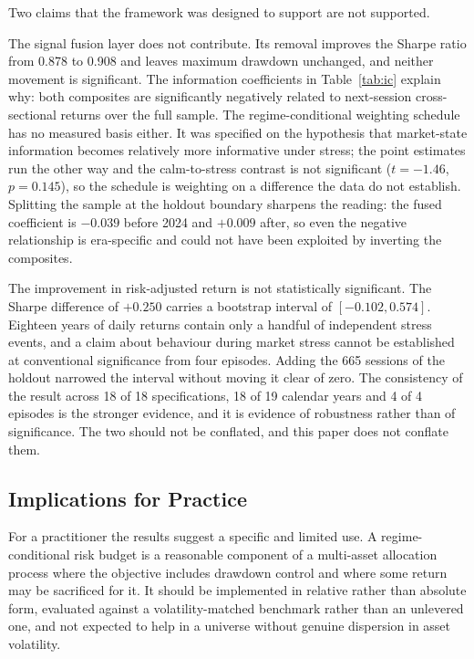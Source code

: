 Two claims that the framework was designed to support are not supported.

The signal fusion layer does not contribute. Its removal improves the Sharpe ratio from
0.878 to 0.908 and leaves maximum drawdown unchanged, and neither movement is
significant. The information coefficients in Table~\ref{tab:ic} explain why: both composites are
significantly negatively related to next-session cross-sectional returns over the full
sample. The regime-conditional weighting schedule has no measured basis either. It was
specified on the hypothesis that market-state information becomes relatively more
informative under stress; the point estimates run the other way and the calm-to-stress
contrast is not significant ($t = -1.46$, $p = 0.145$), so the schedule is weighting on a
difference the data do not establish. Splitting the sample at the holdout boundary
sharpens the reading: the fused coefficient is $-0.039$ before 2024 and $+0.009$ after,
so even the negative relationship is era-specific and could not have been exploited by
inverting the composites.

The improvement in risk-adjusted return is not statistically significant. The Sharpe
difference of $+0.250$ carries a bootstrap interval of $[-0.102, 0.574]$. Eighteen years
of daily returns contain only a handful of independent stress events, and a claim about
behaviour during market stress cannot be established at conventional significance from
four episodes. Adding the 665 sessions of the holdout narrowed the interval without
moving it clear of zero. The consistency of the result across 18 of 18 specifications,
18 of 19 calendar years and 4 of 4 episodes is the stronger evidence, and it is evidence of
robustness rather than of significance. The two should not be conflated, and this paper
does not conflate them.

\subsection{Implications for Practice}

For a practitioner the results suggest a specific and limited use. A regime-conditional
risk budget is a reasonable component of a multi-asset allocation process where the
objective includes drawdown control and where some return may be sacrificed for it. It
should be implemented in relative rather than absolute form, evaluated against a
volatility-matched benchmark rather than an unlevered one, and not expected to help in
a universe without genuine dispersion in asset volatility.

